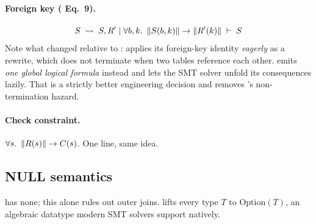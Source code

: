 \paragraph{Foreign key (\cite{qed} Eq.\ 9).}
\[
S \;\rightsquigarrow\; S,R' \mid \forall b,k.\ \left\lVert S(b,k) \right\rVert\to\left\lVert R'(k) \right\rVert \;\vdash\; S
\]
Note what changed relative to \udp{}: \udp{} applies its foreign-key identity
\emph{eagerly} as a rewrite, which does not terminate when two tables reference each other.
\QED{} emits \emph{one global logical formula} instead and lets the SMT solver unfold its
consequences lazily. That is a strictly better engineering decision and removes \udp{}'s
non-termination hazard.

\paragraph{Check constraint.} $\forall s.\ \left\lVert R(s) \right\rVert\to C(s)$. One line, same idea.

\subsection{NULL semantics}

\udp{} has none; this alone rules out outer joins. \QED{} lifts every type $T$ to
$\mathrm{Option}(T)$, an algebraic datatype modern SMT solvers support natively.

